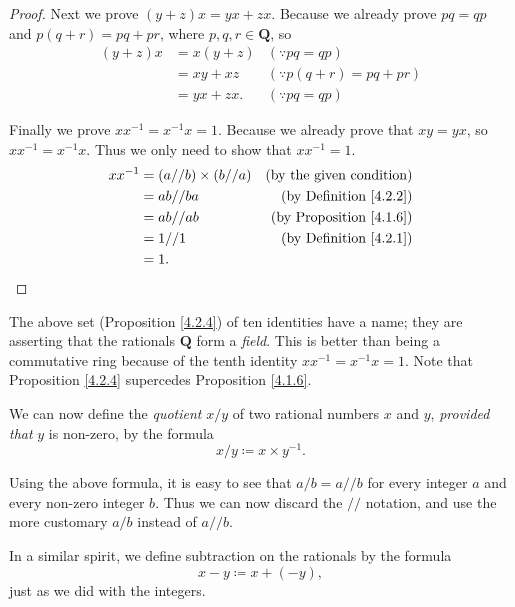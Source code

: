 \begin{proof}
Next we prove \((y + z)x = yx + zx\).
Because we already prove \(pq = qp\) and \(p(q + r) = pq + pr\), where \(p, q, r \in \mathbf{Q}\),
so
\begin{align*}
(y + z)x &= x(y + z) & (\because pq = qp) \\
&= xy + xz & (\because p(q + r) = pq + pr) \\
&= yx + zx. & (\because pq = qp)
\end{align*}

Finally we prove \(xx^{-1} = x^{-1}x = 1\).
Because we already prove that \(xy = yx\), so \(xx^{-1} = x^{-1}x\).
Thus we only need to show that \(xx^{-1} = 1\).
\begin{align*}
xx^{-1} &= (a // b) \times (b // a) & \text{(by the given condition)} \\
&= ab // ba & \text{(by Definition \ref{4.2.2})} \\
&= ab // ab & \text{(by Proposition \ref{4.1.6})} \\
&= 1 // 1  & \text{(by Definition \ref{4.2.1})} \\
&= 1.
\end{align*}
\end{proof}

\begin{remark}\label{4.2.5}
The above set (Proposition \ref{4.2.4}) of ten identities have a name;
they are asserting that the rationals \(\mathbf{Q}\) form a \emph{field}.
This is better than being a commutative ring because of the tenth identity \(xx^{-1} = x^{-1}x = 1\).
Note that Proposition \ref{4.2.4} supercedes Proposition \ref{4.1.6}.
\end{remark}

\begin{note}
We can now define the \emph{quotient} \(x / y\) of two rational numbers \(x\) and \(y\), \emph{provided that} \(y\) is non-zero, by the formula
\[
    x / y \coloneqq x \times y^{-1}.
\]
\end{note}

\begin{note}
Using the above formula, it is easy to see that \(a / b = a // b\) for every integer \(a\) and every non-zero integer \(b\).
Thus we can now discard the \(//\) notation, and use the more customary \(a / b\) instead of \(a // b\).
\end{note}

\begin{note}
In a similar spirit, we define subtraction on the rationals by the formula
\[
    x - y \coloneqq x + (-y),
\]
just as we did with the integers.
\end{note}

